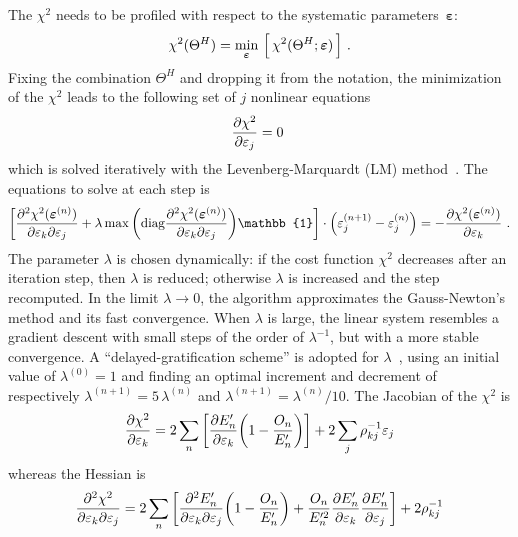 \documentclass[a4paper, 11pt]{article}
\newcommand{\bs}{\boldsymbol}
\begin{document}
The $\chi^2$ needs to be profiled with respect to the systematic parameters~$\bs{\varepsilon}$:
\begin{equation}
	\label{eq:chi2_min}
	\chi^2(\Theta^H) = \min_{\bs{\varepsilon}}\, \qty\Big[\,\chi^2(\Theta^H;\bs{\varepsilon})\,]\ .
\end{equation}
Fixing the combination $\Theta^H$ and dropping it from the notation, %
the minimization of the $\chi^2$ leads to the following set of $j$ nonlinear equations %
\begin{equation}
	\pdv{\chi^2}{\varepsilon_j} (\bs{\varepsilon}) = 0\ 
\end{equation}
which is solved iteratively with the Levenberg-Marquardt (LM) method~\cite{Levenberg_1944, Marquardt_1963}.
The equations to solve at each step is
\begin{equation}
	\qty[\pdv{\chi^2(\bs{\varepsilon}^{(n)})}{\varepsilon_k}{\varepsilon_j} %
	+ \lambda \max \qty(\text{diag} \pdv{\chi^2(\bs{\varepsilon}^{(n)})}{\varepsilon_k}{\varepsilon_j}) \mathbb{1}]
	\cdot \qty(\varepsilon_j^{(n+1)} - \varepsilon_j^{(n)}) = %
	-\pdv{\chi^2(\bs{\varepsilon}^{(n)})}{\varepsilon_k}\ .
\end{equation}
The parameter $\lambda$ is chosen dynamically: if the cost function $\chi^2$ decreases %
after an iteration step, then $\lambda$ is reduced; otherwise $\lambda$ is increased and the step recomputed.
In the limit $\lambda \to 0$, the algorithm approximates the Gauss-Newton's method and its fast convergence.
When $\lambda$ is large, the linear system resembles a gradient descent with small steps of the order of $\lambda^{-1}$, %
but with a more stable convergence.
A ``delayed-gratification scheme'' is adopted for $\lambda$~\cite{Transtrum2012}, using an initial value of $\lambda^{(0)} = 1$ and finding %
an optimal increment and decrement of respectively $\lambda^{(n+1)} = 5\,\lambda^{(n)}$ and $\lambda^{(n+1)} = \lambda^{(n)} / 10$.
The Jacobian of the $\chi^2$ is 
\begin{equation}
	\pdv{\chi^2}{\varepsilon_k} =
	2\sum_n \qty[\pdv{E_n'}{\varepsilon_k}\qty(1 - \frac{O_n}{E_n'})]
	+ 2\sum_j \rho^{-1}_{kj} \varepsilon_j
\end{equation}
whereas the Hessian is
\begin{equation}
	\pdv{\chi^2}{\varepsilon_k}{\varepsilon_j} =
	2\sum_n \qty[\pdv{E_n'}{\varepsilon_k}{\varepsilon_j} \qty(1 - \frac{O_n}{E_n'})
	+ \frac{O_n}{E_n'^2} \pdv{E_n'}{\varepsilon_k} \pdv{E_n'}{\varepsilon_j}]
	+ 2 \rho^{-1}_{kj}
\end{equation}
\end{document}
